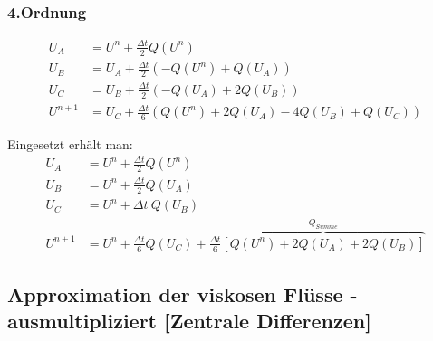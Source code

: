 \subsubsection{4.Ordnung}
\begin{align*}
U_{A}&=U^{n}+ \frac{\varDelta t}{2} Q\left(U^{n}\right)
\\
U_{B}&=U_{A}+ \frac{\varDelta t}{2} \left(-Q\left(U^{n}\right)+Q\left(U_{A}\right)\right)
\\
U_{C}&=U_{B}+ \frac{\varDelta t}{2} \left(-Q\left(U_{A}\right)+2Q\left(U_{B}\right)\right)
\\
U^{n+1}&=U_{C}+\frac{\varDelta t}{6} \left(Q\left(U^{n}\right)+2Q\left(U_{A}\right)-4Q\left(U_{B}\right)+Q\left(U_{C}\right)\right)
\end{align*}

Eingesetzt erhält man:
\begin{align*}
U_{A}&=U^{n}+ \frac{\varDelta t}{2} Q\left(U^{n}\right)
\\
U_{B}&=U^{n}+ \frac{\varDelta t}{2} Q\left(U_{A}\right)
\\
U_{C}&=U^{n}+ \varDelta t\ Q\left(U_{B}\right)
\\
U^{n+1}&=U^{n}+\frac{\varDelta t}{6}Q\left(U_{C}\right)+\frac{\varDelta t}{6} \overbrace{ \left[Q\left(U^{n}\right)+2 Q\left(U_{A}\right)+2 Q\left(U_{B}\right)\right]}^{Q_{Summe}}
\end{align*}


\subsection{Approximation der viskosen Flüsse - ausmultipliziert [Zentrale Differenzen]}
